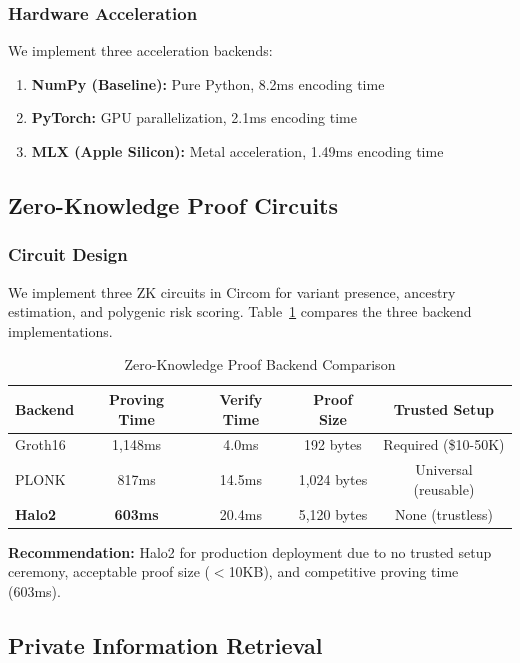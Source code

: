 \documentclass[11pt,a4paper]{article}
\begin{document}
\subsubsection{Hardware Acceleration}

We implement three acceleration backends:

\begin{enumerate}
    \item \textbf{NumPy (Baseline):} Pure Python, 8.2ms encoding time
    \item \textbf{PyTorch:} GPU parallelization, 2.1ms encoding time
    \item \textbf{MLX (Apple Silicon):} Metal acceleration, 1.49ms encoding time
\end{enumerate}

\subsection{Zero-Knowledge Proof Circuits}

\subsubsection{Circuit Design}

We implement three ZK circuits in Circom for variant presence, ancestry estimation, and polygenic risk scoring. Table~\ref{tab:zk_backends} compares the three backend implementations.

\begin{table}[H]
\centering
\caption{Zero-Knowledge Proof Backend Comparison}
\label{tab:zk_backends}
\begin{tabular}{lcccc}
\toprule
\textbf{Backend} & \textbf{Proving Time} & \textbf{Verify Time} & \textbf{Proof Size} & \textbf{Trusted Setup} \\
\midrule
Groth16 & 1,148ms & 4.0ms & 192 bytes & Required (\$10-50K) \\
PLONK & 817ms & 14.5ms & 1,024 bytes & Universal (reusable) \\
\textbf{Halo2} & \textbf{603ms} & 20.4ms & 5,120 bytes & None (trustless) \\
\bottomrule
\end{tabular}
\end{table}

\textbf{Recommendation:} Halo2 for production deployment due to no trusted setup ceremony, acceptable proof size ($<$10KB), and competitive proving time (603ms).

\subsection{Private Information Retrieval}
\end{document}
